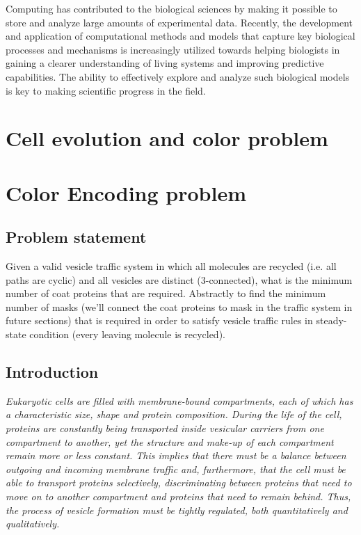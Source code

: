 \documentclass[preprint,12pt]{elsarticle}
\begin{document}
Computing has contributed to the biological sciences by making it possible to store and analyze large amounts of experimental data. Recently, the development and application of computational methods and models that capture key biological processes and mechanisms is increasingly utilized towards helping biologists in gaining a clearer understanding of living systems and improving predictive capabilities. The ability to effectively explore and analyze such biological models is key to making scientific progress in the field.

\section*{Cell evolution and color problem}

\section{Color Encoding problem}
\subsection{Problem statement}
Given a valid vesicle traffic system in which all molecules are recycled (i.e. all paths are cyclic) and all vesicles are distinct (3-connected), what is the minimum number of coat proteins that are
required. Abstractly to find the minimum number of masks (we'll connect the coat proteins to mask in the traffic system in future sections) that is required in order to satisfy vesicle traffic rules in steady-state condition (every leaving molecule is recycled). 

\subsection{Introduction }
\textit{Eukaryotic cells are filled with membrane-bound compartments, each of which has a characteristic size, shape and protein composition. During the life of the cell, proteins are constantly being transported inside vesicular carriers from one compartment to another, yet the structure and make-up of each compartment remain more or less constant. This implies that there must be a balance between outgoing and incoming
membrane traffic and, furthermore, that the cell must be able to transport proteins selectively, discriminating between proteins that need to move on to another compartment and proteins that need to remain behind. Thus, the process of vesicle formation must be tightly regulated, both quantitatively and qualitatively.}
\end{document}
